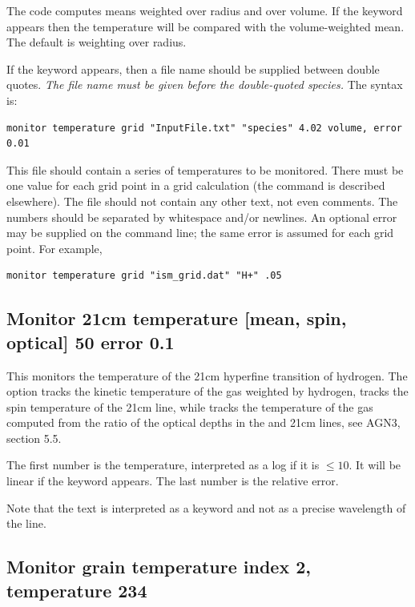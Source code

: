 The code computes means weighted over radius and over volume.
If the keyword  appears then the temperature will
be compared with the volume-weighted mean.
The default is weighting over radius.

If the keyword  appears, then a file name should be supplied
between double quotes.
\textit{The file name must be given before the double-quoted species.}
The syntax is:
%
\begin{verbatim}
monitor temperature grid "InputFile.txt" "species" 4.02 volume, error 0.01
\end{verbatim}
%
This file should contain a series of temperatures to be monitored.
There must be one value for each grid point in a grid calculation
(the  command is described elsewhere). The file should not contain
any other text, not even comments. The numbers should be separated by whitespace
and/or newlines.
An optional error may be supplied on the command line; the same error is
assumed for each grid point.
For example,
%
\begin{verbatim}
monitor temperature grid "ism_grid.dat" "H+" .05
\end{verbatim}
%

\subsection{Monitor 21cm temperature [mean, spin, optical] 50 error 0.1}

This monitors the temperature of the 21cm hyperfine transition of hydrogen.
The  option tracks the kinetic temperature of the gas
weighted by hydrogen,  tracks the spin temperature of the 21cm line,
while  tracks the temperature of the gas computed from the ratio
of the optical depths in the \la{} and 21cm lines, see AGN3, section 5.5.

The first number is the temperature, interpreted as a log if
it is $\le 10$.
It will be linear if the keyword  appears.
The last number is the relative error.

Note that the text \cdCommand{21cm} is interpreted as a keyword and not as a precise wavelength
of the line.

\subsection{Monitor grain temperature index 2, temperature  234}

